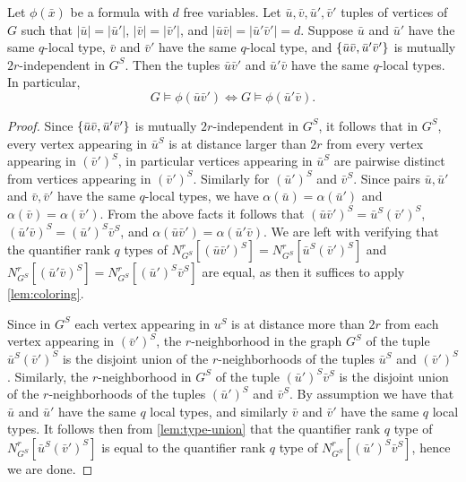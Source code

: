 \begin{lemma}\label{lem:crossing}	Let $\phi(\bar x)$ be a formula with
	 $d$ free variables.
  Let $\bar u,\bar v,\bar u',\bar v'$ tuples of vertices of $G$
  such that $|\bar u|=|\bar u'|$, $|\bar v|=|\bar v'|$, and $|\bar u\bar v|=|\bar u'\bar v'|=d$.
  Suppose $\bar u$ and $\bar u'$ have the same $q$-local type, $\bar v$ and $\bar v'$ have the same $q$-local type, and $\{\bar u\bar v,\bar u'\bar v'\}$
  is mutually $2r$-independent in $G^S$. Then 
  the tuples $\bar u\bar v'$ and $\bar u'\bar v$
  have the same $q$-local types. In particular, 
$$G\models \phi(\bar u\bar v')\iff G\models \phi(\bar u'\bar v).$$
\end{lemma}
\begin{proof}
Since $\{\bar u\bar v,\bar u'\bar v'\}$ is mutually $2r$-independent in $G^S$, it follows that in $G^S$, every vertex appearing in $\bar u^S$ is at distance larger than $2r$ from every vertex appearing in $(\bar v')^S$,
in particular vertices appearing in $\bar u^S$ are pairwise distinct from vertices appearing in $(\bar v')^S$.
Similarly for $(\bar u')^S$ and $\bar v^S$. Since pairs $\bar u,\bar u'$ and $\bar v,\bar v'$ have the same $q$-local types, we have $\alpha(\bar u)=\alpha(\bar u')$ and $\alpha(\bar v)=\alpha(\bar v')$.
From the above facts it follows that $(\bar u\bar v')^S=\bar u^S(\bar v')^S$, $(\bar u'\bar v)^S=(\bar u')^S\bar v^S$, and $\alpha(\bar u\bar v')=\alpha(\bar u'\bar v)$.
We are left with verifying that the quantifier rank $q$ types of $N^r_{G^S}[(\bar u\bar  v')^S]=N^r_{G^S}[\bar u^S(\bar  v')^S]$ and $N^r_{G^S}[(\bar u'\bar v)^S]=N^r_{G^S}[(\bar u')^S\bar  v^S]$ are equal, 
as then it suffices to apply \cref{lem:coloring}.

Since in $G^S$ each vertex appearing in $u^S$ is at distance more than $2r$ from each vertex appearing in $(\bar v')^S$, the $r$-neighborhood in the graph $G^S$
of the tuple $\bar u^S(\bar v')^S$
is the disjoint union of the $r$-neighborhoods
of the tuples $\bar u^S$ and $(\bar v')^S$.
Similarly, the $r$-neighborhood in $G^S$
of the tuple $(\bar u')^S\bar v^S$
is the disjoint union of the $r$-neighborhoods
of the tuples $(\bar u')^S$ and $\bar v^S$.
By assumption we have that $\bar u$ and $\bar u'$ have the same $q$ local types,
and similarly $\bar v$ and $\bar v'$ have the same $q$ local types.
It follows then from \cref{lem:type-union} that
the quantifier rank $q$ type of $N^r_{G^S}[\bar u^S(\bar  v')^S]$ is equal to the quantifier rank $q$ type of 
$N^r_{G^S}[(\bar u')^S\bar  v^S]$, hence we are done.
\end{proof}




